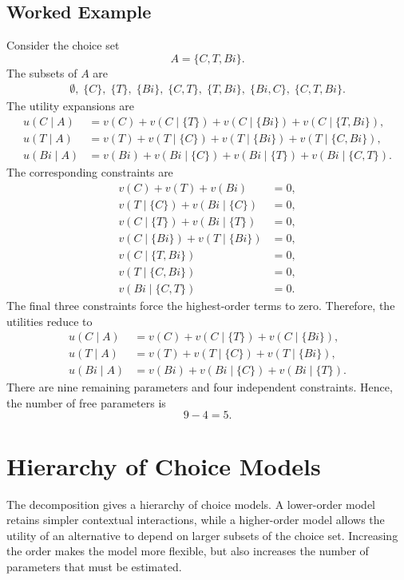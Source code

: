 \documentclass[12pt,oneside]{report}
\begin{document}
\subsection{Worked Example}
Consider the choice set
\begin{equation}
    A=\{C,T,Bi\}.
\end{equation}
The subsets of $A$ are
\begin{equation}
\begin{split}
    \emptyset,\;
    \{C\},\;
    \{T\},\;
    \{Bi\},\;
    \{C,T\},\;
    \{T,Bi\},\;
    \{Bi,C\},\;
    \{C,T,Bi\}.
\end{split}
\end{equation}
The utility expansions are
\begin{align*}
    u(C\mid A)
    &=v(C)+v(C\mid\{T\})+v(C\mid\{Bi\})+v(C\mid\{T,Bi\}),\\
    u(T\mid A)
    &=v(T)+v(T\mid\{C\})+v(T\mid\{Bi\})+v(T\mid\{C,Bi\}),\\
    u(Bi\mid A)
    &=v(Bi)+v(Bi\mid\{C\})+v(Bi\mid\{T\})+v(Bi\mid\{C,T\}).
\end{align*}
The corresponding constraints are
\begin{align*}
    v(C)+v(T)+v(Bi)&=0,\label{eq:constraint-empty}\\
    v(T\mid\{C\})+v(Bi\mid\{C\})&=0,\\
    v(C\mid\{T\})+v(Bi\mid\{T\})&=0,\\
    v(C\mid\{Bi\})+v(T\mid\{Bi\})&=0,\\
    v(C\mid\{T,Bi\})&=0,\\
    v(T\mid\{C,Bi\})&=0,\\
    v(Bi\mid\{C,T\})&=0.
\end{align*}
The final three constraints force the highest-order terms to zero. Therefore,
the utilities reduce to
\begin{align*}
    u(C\mid A)
    &=v(C)+v(C\mid\{T\})+v(C\mid\{Bi\}),\\
    u(T\mid A)
    &=v(T)+v(T\mid\{C\})+v(T\mid\{Bi\}),\\
    u(Bi\mid A)
    &=v(Bi)+v(Bi\mid\{C\})+v(Bi\mid\{T\}).
\end{align*}
There are nine remaining parameters and four independent constraints. Hence,
the number of free parameters is
\begin{equation}
    9-4=5.
    \label{eq:three-alternative-free-parameters}
\end{equation}
\section{Hierarchy of Choice Models}
The decomposition gives a hierarchy of choice models. A lower-order model
retains simpler contextual interactions, while a higher-order model allows the
utility of an alternative to depend on larger subsets of the choice set.
Increasing the order makes the model more flexible, but also increases the
number of parameters that must be estimated.
\end{document}
